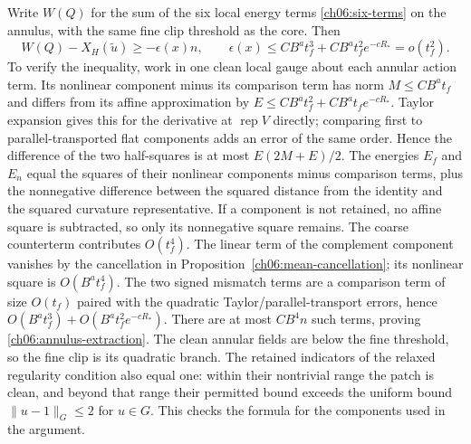 Write $W(Q)$ for the sum of the six local energy terms
\eqref{ch06:six-terms} on the annulus, with the same fine clip threshold
as the core. Then
\begin{equation}
 W(Q)-X_H(\widetilde u)\ge-\epsilon(x)n,\qquad
 \epsilon(x)\le C B^a t_f^3+C B^a t_f^2e^{-cR_*}
                         =o(t_f^2).
 \label{ch06:annulus-extraction}
\end{equation}
To verify the inequality, work in one clean local gauge about each
annular action term. Its nonlinear component minus its comparison term has norm
$M\le C B^a t_f$ and differs from its affine approximation
by $E\le C B^a t_f^2+C B^a t_f e^{-cR_*}$.
Taylor expansion gives this for the derivative at $\operatorname{rep}V$
directly; comparing first to parallel-transported flat components adds an error of
the same order. Hence the difference of the two half-squares is at
most $E(2M+E)/2$. The energies $E_f$ and $E_n$ equal the squares of their
nonlinear components minus comparison terms, plus the nonnegative difference between the squared distance from the identity and
the squared curvature representative. If a component is not retained, no affine square is subtracted,
so only its nonnegative square remains.
The coarse counterterm contributes $O(t_f^4)$.
The linear term of the complement component vanishes by the cancellation in
Proposition~\ref{ch06:mean-cancellation}; its nonlinear square is
$O(B^a t_f^4)$. The two signed mismatch terms are a comparison term of size
$O(t_f)$ paired with the quadratic Taylor/parallel-transport errors, hence
$O(B^a t_f^3)+O(B^a t_f^2e^{-cR_*})$.
There are at most $C B^4n$ such terms, proving
\eqref{ch06:annulus-extraction}.
The clean annular fields are below the fine threshold, so the fine
clip is its quadratic branch. The retained indicators of the relaxed regularity condition also equal
one: within their nontrivial range the patch is clean, and beyond
that range their permitted bound exceeds the uniform bound $\|u-1\|_G\le 2$ for $u\in G$. This checks the formula for the components used in the argument.

